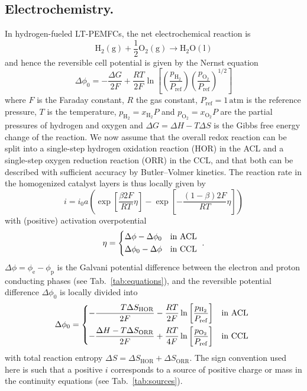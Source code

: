 \documentclass[fontsize=9pt,DIV=calc,a4paper,twocolumn]{scrartcl}
\begin{document}
\subsection*{Electrochemistry.}

In hydrogen-fueled LT-PEMFCs, the net electrochemical reaction is
%
\begin{equation}
\label{eq:reaction}
\mathrm{H}_2(\mathrm{g})+\frac{1}{2}\mathrm{O}_2(\mathrm{g})\to\mathrm{H}_2\mathrm{O}(\mathrm{l})
\end{equation}
%
and hence the reversible cell potential is given by the Nernst equation \cite{li:06}
%
\begin{equation}
\label{eq:nernst}
\Delta\phi_0 = -\frac{\Delta G}{2F}+\frac{RT}{2F}\ln\left[\left(\frac{p_{\mathrm{H}_2}}{P_\mathrm{ref}}\right)\left(\frac{p_{\mathrm{O}_2}}{P_\mathrm{ref}}\right)^{1/2}\right]
\end{equation}
%
where $F$ is the Faraday constant, $R$ the gas constant, $P_\mathrm{ref}=1\,\mathrm{atm}$ is the reference pressure, $T$ is the temperature, $p_{\mathrm{H}_2}=x_{\mathrm{H}_2}P$ and $p_{\mathrm{O}_2}=x_{\mathrm{O}_2}P$ are the partial pressures of hydrogen and oxygen and $\Delta G=\Delta H-T\Delta S$ is the Gibbs free energy change of the reaction. We now assume that the overall redox reaction can be split into a single-step hydrogen oxidation reaction (HOR) in the ACL and a single-step oxygen reduction reaction (ORR) in the CCL, and that both can be described with sufficient accuracy by Butler--Volmer kinetics. The reaction rate in the homogenized catalyst layers is thus locally given by \cite{hamann:98,li:06,ohayre:09}
%
\begin{equation}
\label{eq:bv}
i = i_0 a\left(\exp\left[\frac{\beta 2F}{RT}\eta\right] - \exp\left[-\frac{(1-\beta)2F}{RT}\eta\right]\right)
\end{equation}
%
with (positive) activation overpotential
%
\begin{equation}
\eta = \begin{dcases*}
\Delta\phi-\Delta\phi_0 & in ACL\\
\Delta\phi_0-\Delta\phi & in CCL
\end{dcases*}.
\end{equation}
%
$\Delta\phi = \phi_\mathrm{e}-\phi_\mathrm{p}$ is the Galvani potential difference between the electron and proton conducting phases (see Tab.~\ref{tab:equations}), and the reversible potential difference $\Delta\phi_0$ is locally divided into
%
\begin{equation}
\Delta\phi_0 = \begin{dcases*}
-\frac{\phantom{\Delta H-{}}T\Delta S_\mathrm{HOR}}{2F}-\frac{RT}{2F}\ln\left[\frac{p_{\mathrm{H}_2}}{P_\mathrm{ref}}\right] & in ACL\\
-\frac{\Delta H-T\Delta S_\mathrm{ORR}}{2F}+\frac{RT}{4F}\ln\left[\frac{p_{\mathrm{O}_2}}{P_\mathrm{ref}}\right] & in CCL
\end{dcases*}
\end{equation}
%
with total reaction entropy $\Delta S=\Delta S_\mathrm{HOR}+\Delta S_\mathrm{ORR}$. The sign convention used here is such that a positive $i$ corresponds to a source of positive charge or mass in the continuity equations (see Tab.~\ref{tab:sources}).
\end{document}

